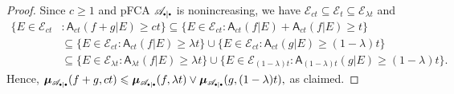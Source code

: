 \documentclass[10pt,a4paper]{amsart}
\newcommand\aAd[3][E]{\sA_{#3}(#2|#1)}%
\newcommand{\bmu}{\boldsymbol{\mu}}
\newcommand\bmub[1][\bpeA]{\bmu_{#1}}
\newcommand\bpeA{\mathscr {A}_{\sbullet|\sbullet}}%
\newcommand\cE{{\mathcal E}}
\renewcommand\ge{\geqslant}
\renewcommand\le{\leqslant}
\newcommand\sA{\mathsf{A}}
\newcommand\sbullet[1][.5]{\mathbin{\vcenter{\hbox{\scalebox{#1}{$\bullet$}}}}}
\begin{document}
\begin{proof} Since $c\ge 1$ and pFCA $\bpeA$ is nonincreasing, we have $\cE_{ct}\subseteq \cE_t\subseteq \cE_{\lambda t}$ and
\begin{align*}
   \big\{E\in \cE_{ct}&\colon \aAd{f+g}{ct} \ge ct\big\}\subseteq  \big\{E\in \cE_{ct}\colon \aAd{f}{ct}+\aAd{f}{ct} \ge t\big\}
   \\ &\subseteq\big\{E\in \cE_{ct}\colon \aAd{f}{ct} \ge \lambda t\}\cup\{E\in \cE_{ct}\colon \aAd{g}{ct} \ge (1-\lambda)t\big\}
    \\ &\subseteq\big\{E\in \cE_{\lambda t}\colon \aAd{f}{\lambda t} \ge \lambda t\big\}\cup \big\{E\in \cE_{(1-\lambda) t}\colon \aAd{g}{(1-\lambda) t} \ge (1-\lambda)t\big\}.
\end{align*}
Hence, $\bmub(f+g,ct)\le \bmub(f,\lambda t)\vee \bmub(g,(1-\lambda) t),$ as claimed.
\end{proof}
\end{document}
